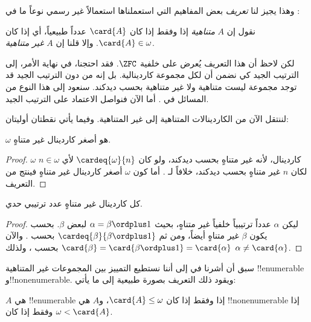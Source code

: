 \documentclass[../../../include/open-logic-section]{subfiles}
\begin{document}
وهذا يجيز لنا \emph{تعريف} بعض المفاهيم التي استعملناها استعمالاً غير
رسمي نوعاً ما في :

\begin{defn}
نقول إن $A$ \emph{متناهية} إذا وفقط إذا كان $\card{A}$ عدداً طبيعياً،
أي إذا كان $\card{A} \in \omega$. وإلا قلنا إن $A$
\emph{غير متناهية}.
\end{defn}
\noindent
لكن لاحظ أن هذا التعريف يُعرض على خلفية $\ZFC$. فقد احتجنا، في نهاية
الأمر، إلى الترتيب الجيد كي نضمن أن لكل مجموعة كاردينالية. بل إنه من دون
الترتيب الجيد قد توجد مجموعة ليست متناهية ولا غير متناهية بحسب ديدكند.
سنعود إلى هذا النوع من المسائل في . أما الآن
فنواصل الاعتماد على الترتيب الجيد.

لننتقل الآن من الكاردينالات المتناهية إلى غير المتناهية. وفيما يأتي
نقطتان أوليتان:

\begin{cor}
$\omega$ هو أصغر كاردينال غير متناهٍ.
\end{cor}

\begin{proof}
$\omega$ كاردينال، لأنه غير متناهٍ بحسب ديدكند، ولو كان
$\cardeq{\omega}{n}$ لأي $n \in \omega$ لكان $n$ غير متناهٍ بحسب
ديدكند، خلافاً لـ
. أما كون
$\omega$ أصغر كاردينال غير متناهٍ فينتج من التعريف.
\end{proof}

\begin{cor}
كل كاردينال غير متناهٍ عدد ترتيبي حدي.
\end{cor}

\begin{proof}
ليكن $\alpha$ عدداً ترتيبياً خلفياً غير متناهٍ، بحيث
$\alpha = \beta \ordplus 1$ لبعض $\beta$. بحسب
 يكون $\beta$ غير متناهٍ أيضاً، ومن ثم
$\cardeq{\beta}{\beta \ordplus 1}$ بحسب
. والآن
$\card{\beta} = \card{\beta\ordplus 1} = \card{\alpha}$ بحسب
، ولذلك
$\alpha \neq \card{\alpha}$.
\end{proof}

سبق أن أشرنا في  إلى أننا
نستطيع التمييز بين المجموعات غير المتناهية !!{enumerable}
و!!{nonenumerable}. ويقود ذلك التعريف بصورة طبيعية إلى ما يأتي:

\begin{prop}
$A$ هي !!{enumerable} إذا وفقط إذا كان $\card{A} \leq \omega$، و$A$
هي !!{nonenumerable} إذا وفقط إذا كان $\omega < \card{A}$.
\end{prop}
\end{document}
